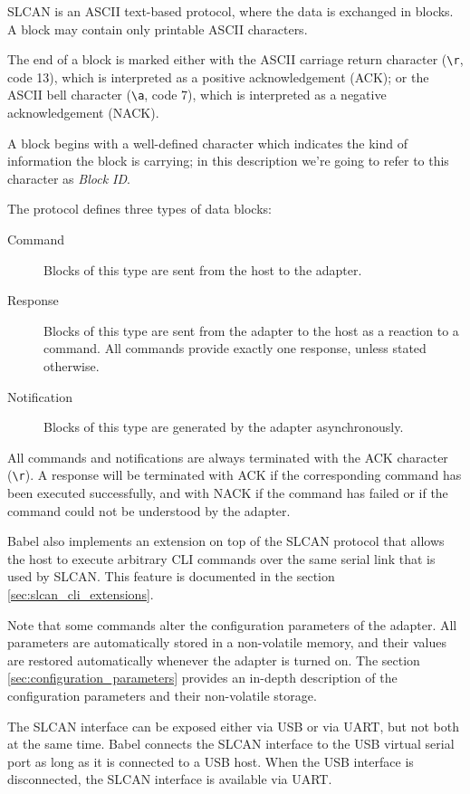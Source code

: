\documentclass{zubaxdoc}
\begin{document}
SLCAN is an ASCII text-based protocol, where the data is exchanged in blocks.
A block may contain only printable ASCII characters.

The end of a block is marked either with the ASCII carriage return character (\verb|\r|, code 13),
which is interpreted as a positive acknowledgement (ACK);
or the ASCII bell character (\verb|\a|, code 7),
which is interpreted as a negative acknowledgement (NACK).

A block begins with a well-defined character which indicates the kind of information the block is carrying;
in this description we're going to refer to this character as \emph{Block ID}.

The protocol defines three types of data blocks:

\begin{description}
    \item[Command] Blocks of this type are sent from the host to the adapter.
    \item[Response] Blocks of this type are sent from the adapter to the host
          as a reaction to a command. All commands provide exactly one response, unless stated otherwise.
    \item[Notification] Blocks of this type are generated by the adapter asynchronously.
\end{description}

All commands and notifications are always terminated with the ACK character (\verb|\r|).
A response will be terminated with ACK if the corresponding command has been executed successfully,
and with NACK if the command has failed or if the command could not be understood by the adapter.

Babel also implements an extension on top of the SLCAN protocol that allows the host to execute
arbitrary CLI commands over the same serial link that is used by SLCAN.
This feature is documented in the section \ref{sec:slcan_cli_extensions}.

Note that some commands alter the configuration parameters of the adapter.
All parameters are automatically stored in a non-volatile memory,
and their values are restored automatically whenever the adapter is turned on.
The section \ref{sec:configuration_parameters} provides an in-depth description of the configuration parameters
and their non-volatile storage.

The SLCAN interface can be exposed either via USB or via UART, but not both at the same time.
Babel connects the SLCAN interface to the USB virtual serial port as long as it is connected to a USB host.
When the USB interface is disconnected, the SLCAN interface is available via UART.
\end{document}
